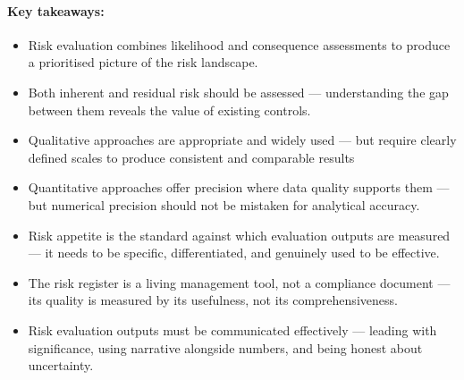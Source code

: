 \paragraph{Key takeaways:}
\begin{itemize}
  \item{Risk evaluation combines likelihood and consequence assessments to produce a prioritised picture of the risk landscape.}
  \item{Both inherent and residual risk should be assessed — understanding the gap between them reveals the value of existing controls.}
  \item{Qualitative approaches are appropriate and widely used — but require clearly defined scales to produce consistent and comparable results}
  \item{Quantitative approaches offer precision where data quality supports them — but numerical precision should not be mistaken for analytical accuracy.}
  \item{Risk appetite is the standard against which evaluation outputs are measured — it needs to be specific, differentiated, and genuinely used to be effective.}
  \item{The risk register is a living management tool, not a compliance document — its quality is measured by its usefulness, not its comprehensiveness.}
  \item{Risk evaluation outputs must be communicated effectively — leading with significance, using narrative alongside numbers, and being honest about uncertainty.}
\end{itemize}

